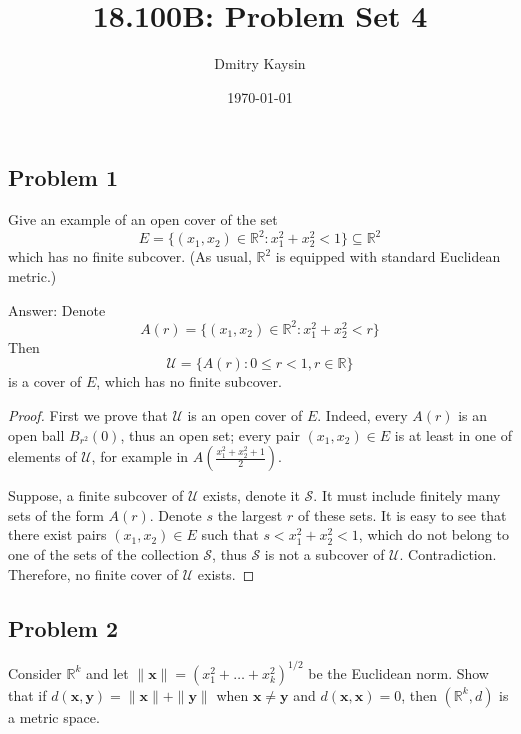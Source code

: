 \documentclass{article}
\title{18.100B: Problem Set 4}
\author{Dmitry Kaysin}
\date\today
\begin{document}
\maketitle 

\subsection*{Problem 1}

\begin{tcolorbox}
Give an example of an open cover of the set
$$ E = \{ (x_1, x_2) \in \mathbb{R}^2 : x_1^2 + x_2^2 < 1 \} \subseteq \mathbb{R}^2 $$
which has no finite subcover. (As usual, $\mathbb{R}^2$ is equipped with standard Euclidean metric.)
\end{tcolorbox}

Answer: Denote 
$$ A(r) = \{ (x_1, x_2) \in \mathbb{R}^2 : x_1^2 + x_2^2 < r \} $$
Then 
$$ \mathcal{U} = \{ A(r) : 0 \leq r < 1, r \in \mathbb{R} \}$$
is a cover of $E$, which has no finite subcover.

\begin{proof}

First we prove that $\mathcal{U}$ is an open cover of $E$. Indeed, every $A(r)$ is an open ball $B_{r^2}(0)$, thus an open set; every pair $(x_1, x_2) \in E$ is at least in one of elements of $\mathcal{U}$, for example in $A(\frac{x_1^2+x_2^2+1}{2})$.

Suppose, a finite subcover of $\mathcal{U}$ exists, denote it $\mathcal{S}$. It must include finitely many sets of the form $A(r)$. Denote $s$ the largest $r$ of these sets. It is easy to see that there exist pairs $(x_1, x_2) \in E$ such that $s < x_1^2 + x_2^2 < 1$, which do not belong to one of the sets of the collection $\mathcal{S}$, thus $\mathcal{S}$ is not a subcover of $\mathcal{U}$. Contradiction. Therefore, no finite cover of $\mathcal{U}$ exists.

\end{proof}

\subsection*{Problem 2}

\begin{tcolorbox}
Consider $\mathbb{R}^k$ and let $\|\mathbf{x}\| = (x_1^2 + \dots + x_k^2)^{1/2}$ be the Euclidean norm. Show that if $d(\mathbf{x}, \mathbf{y}) = \|\mathbf{x}\| + \|\mathbf{y}\|$ when $\mathbf{x} \neq \mathbf{y}$ and $d(\mathbf{x}, \mathbf{x}) = 0$, then $(\mathbb{R}^k, d)$ is a metric space.
\end{tcolorbox}
\end{document}
